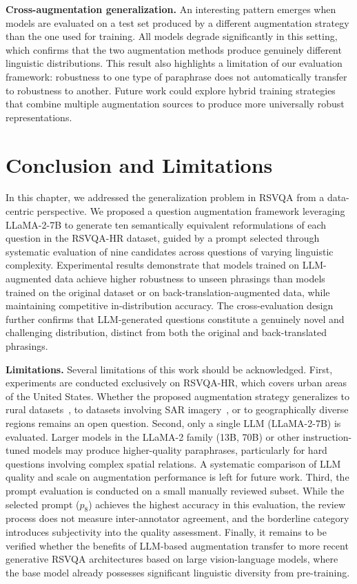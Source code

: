\textbf{Cross-augmentation generalization.}
An interesting pattern emerges when models are
evaluated on a test set produced by a different
augmentation strategy than the one used for training.
All models degrade significantly in this setting,
which confirms that the two augmentation methods
produce genuinely different linguistic distributions.
This result also highlights a limitation of our
evaluation framework: robustness to one type of
paraphrase does not automatically transfer to
robustness to another. Future work could explore
hybrid training strategies that combine multiple
augmentation sources to produce more universally
robust representations.
 
\section{Conclusion and Limitations}
\label{sec:chap3_conclusion}
 
In this chapter, we addressed the generalization problem
in RSVQA from a data-centric perspective. We proposed
a question augmentation framework leveraging LLaMA-2-7B
to generate ten semantically equivalent reformulations
of each question in the RSVQA-HR dataset, guided by a
prompt selected through systematic evaluation of nine
candidates across questions of varying linguistic
complexity. Experimental results demonstrate that models
trained on LLM-augmented data achieve higher robustness
to unseen phrasings than models trained on the original
dataset or on back-translation-augmented data, while
maintaining competitive in-distribution accuracy. The
cross-evaluation design further confirms that LLM-generated
questions constitute a genuinely novel and challenging
distribution, distinct from both the original and
back-translated phrasings.
 
\textbf{Limitations.}
Several limitations of this work should be acknowledged.
First, experiments are conducted exclusively on RSVQA-HR,
which covers urban areas of the United States. Whether
the proposed augmentation strategy generalizes to rural
datasets~\cite{lobry2021rsvqaben}, to datasets involving
SAR imagery~\cite{tosato2024sar}, or to geographically
diverse regions remains an open question.
Second, only a single LLM (LLaMA-2-7B) is evaluated.
Larger models in the LLaMA-2 family (13B, 70B) or
other instruction-tuned models may produce higher-quality
paraphrases, particularly for hard questions involving
complex spatial relations. A systematic comparison of
LLM quality and scale on augmentation performance is
left for future work.
Third, the prompt evaluation is conducted on a small
manually reviewed subset. While the selected prompt
($p_8$) achieves the highest accuracy in this evaluation,
the review process does not measure inter-annotator
agreement, and the borderline category introduces
subjectivity into the quality assessment.
Finally, it remains to be verified whether the benefits
of LLM-based augmentation transfer to more recent
generative RSVQA architectures based on large
vision-language models, where the base model already
possesses significant linguistic diversity from
pre-training.
 
